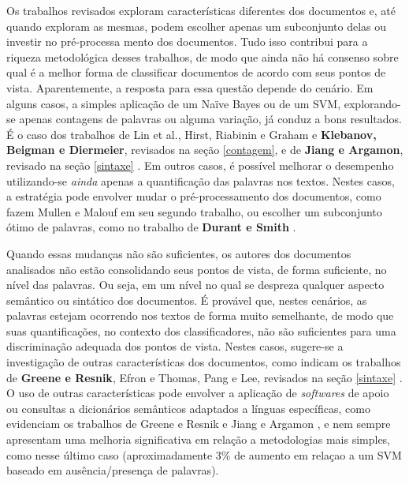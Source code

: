 Os trabalhos revisados exploram características diferentes dos documentos e, até quando exploram as mesmas, podem escolher apenas um subconjunto delas ou investir no pré-processa mento dos documentos. Tudo isso contribui para a riqueza metodológica desses trabalhos, de modo que ainda não há consenso sobre qual é a melhor forma de classificar documentos de acordo com seus pontos de vista. Aparentemente, a resposta para essa questão depende do cenário. Em alguns casos, a simples aplicação de um Naïve Bayes ou de um SVM, explorando-se apenas contagens de palavras ou alguma variação, já conduz a bons resultados. É o caso dos trabalhos de Lin et al., Hirst, Riabinin e Graham e \textbf{Klebanov, Beigman e Diermeier}, revisados na seção \ref{contagem}, e de \textbf{Jiang e Argamon}, revisado na seção \ref{sintaxe} \cite{lin-et-al2006} \cite{hirst-et-al} \cite{klebanov} \cite{jiang-argamon}. Em outros casos, é possível melhorar o desempenho utilizando-se \emph{ainda} apenas a quantificação das palavras nos textos. Nestes casos, a estratégia pode envolver mudar o pré-processamento dos documentos, como fazem Mullen e Malouf em seu segundo trabalho, ou escolher um subconjunto ótimo de palavras, como no trabalho de \textbf{Durant e Smith} \cite{malouf-taking_sides} \cite{durant-smith}.

Quando essas mudanças não são suficientes, os autores dos documentos analisados não estão consolidando seus pontos de vista, de forma suficiente, no nível das palavras. Ou seja, em um nível no qual se despreza qualquer aspecto semântico ou sintático dos documentos. É provável que, nestes cenários,  as palavras estejam ocorrendo nos textos de forma muito semelhante, de modo que suas quantificações, no contexto dos classificadores, não são suficientes para uma discriminação adequada dos pontos de vista. Nestes casos, sugere-se a investigação de outras características dos documentos, como indicam os trabalhos de \textbf{Greene e Resnik}, Efron e Thomas, Pang e Lee, revisados na seção \ref{sintaxe} \cite{greene} \cite{efron} \cite{get-out-the-vote}. O uso de outras características pode envolver a aplicação de \emph{softwares} de apoio ou consultas a dicionários semânticos adaptados a línguas específicas, como evidenciam os trabalhos de Greene e Resnik \cite{greene} e Jiang e Argamon \cite{jiang-argamon}, e nem sempre apresentam uma melhoria significativa em relação a metodologias mais simples, como nesse último caso (aproximadamente 3\% de aumento em relaçao a um SVM baseado em ausência/presença de palavras). %
 
